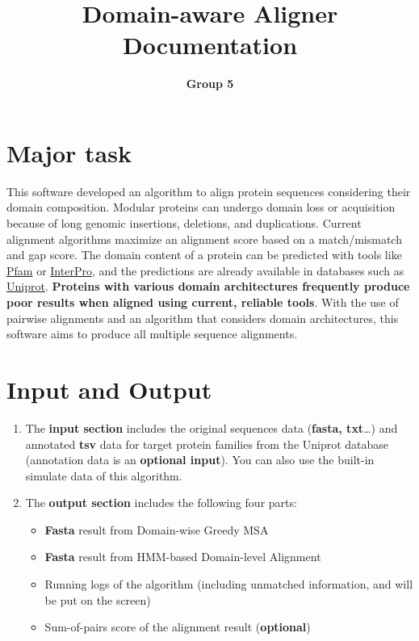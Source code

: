\documentclass{article}
\title{\textbf{Domain-aware Aligner Documentation}}
\author{\textbf{Group 5}}
\begin{document}
\maketitle

\section{Major task}

This software developed an algorithm to align protein sequences considering their domain composition. Modular proteins can undergo domain loss or acquisition because of long genomic insertions, deletions, and duplications. Current alignment algorithms maximize an alignment score based on a match/mismatch and gap score. The domain content of a protein can be predicted with tools like \href{http://pfam.xfam.org/}{Pfam} or \href{https://www.ebi.ac.uk/interpro/}{InterPro}, and the predictions are already available in databases such as \href{https://www.uniprot.org/}{Uniprot}. \textbf{Proteins with various domain architectures frequently produce poor results when aligned using current, reliable tools}. With the use of pairwise alignments and an algorithm that considers domain architectures, this software aims to produce all multiple sequence alignments.

\section{Input and Output}
\begin{enumerate}
\item The \textbf{input section} includes the original sequences data (\textbf{fasta, txt}…) and annotated \textbf{tsv} data for target protein families from the Uniprot database (annotation data is an \textbf{optional input}). You can also use the built-in simulate data of this algorithm.
\item The \textbf{output section} includes the following four parts:
\begin{itemize}
\item \textbf{Fasta} result from Domain-wise Greedy MSA
\item \textbf{Fasta} result from HMM-based Domain-level Alignment
\item Running logs of the algorithm (including unmatched information, and will be put on the screen)
\item Sum-of-pairs score of the alignment result (\textbf{optional})
\end{itemize}
\end{enumerate}\\
\end{document}
